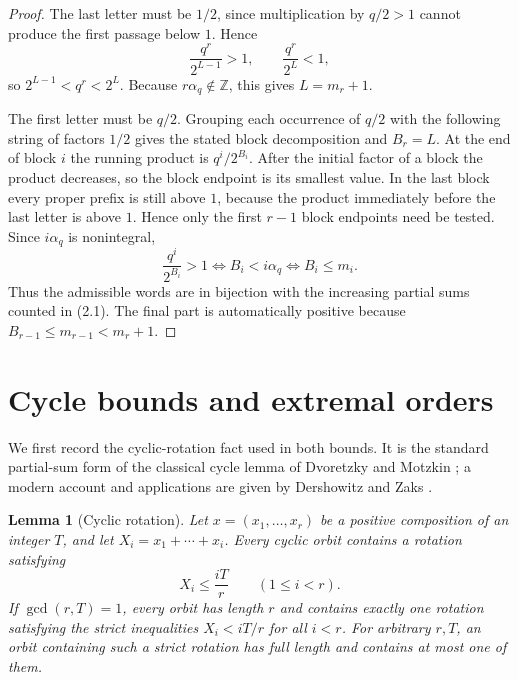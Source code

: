 \documentclass[11pt]{article}
\newtheorem{lemma}[theorem]{Lemma}
\begin{document}
\begin{proof}
The last letter must be \(1/2\), since multiplication by \(q/2>1\) cannot
produce the first passage below \(1\). Hence
\[
 \frac{q^r}{2^{L-1}}>1,
 \qquad
 \frac{q^r}{2^L}<1,
\]
so \(2^{L-1}<q^r<2^L\). Because \(r\alpha_q\notin\mathbb Z\), this gives
\(L=m_r+1\).

The first letter must be \(q/2\). Grouping each occurrence of \(q/2\)
with the following string of factors \(1/2\) gives the stated block
decomposition and \(B_r=L\). At the end of block \(i\) the running product
is \(q^i/2^{B_i}\). After the initial factor of a block the product decreases,
so the block endpoint is its smallest value. In the last block every proper
prefix is still above \(1\), because the product immediately before the
last letter is above \(1\). Hence only the first \(r-1\) block endpoints
need be tested. Since \(i\alpha_q\) is nonintegral,
\[
 \frac{q^i}{2^{B_i}}>1
 \iff B_i<i\alpha_q
 \iff B_i\leq m_i.
\]
Thus the admissible words are in bijection with the increasing partial sums
counted in (2.1). The final part is automatically positive because
\(B_{r-1}\leq m_{r-1}<m_r+1\).
\end{proof}

\section{Cycle bounds and extremal orders}
\label{sec:extremal}

We first record the cyclic-rotation fact used in both bounds.  It is the
standard partial-sum form of the classical cycle lemma of Dvoretzky and
Motzkin \cite{DvoretzkyMotzkin47}; a modern account and applications are
given by Dershowitz and Zaks \cite{DershowitzZaks90}.

\begin{lemma}[Cyclic rotation]
\label{lem:rotation}
Let \(x=(x_1,\ldots,x_r)\) be a positive composition of an integer \(T\),
and let \(X_i=x_1+\cdots+x_i\). Every cyclic orbit contains a rotation
satisfying
\[
 X_i\leq\frac{iT}{r}
 \qquad(1\leq i<r).
 \tag{3.1}
\]
If \(\gcd(r,T)=1\), every orbit has length \(r\) and contains exactly one
rotation satisfying the strict inequalities \(X_i<iT/r\) for all
\(i<r\). For arbitrary \(r,T\), an orbit containing such a strict rotation
has full length and contains at most one of them.
\end{lemma}
\end{document}

